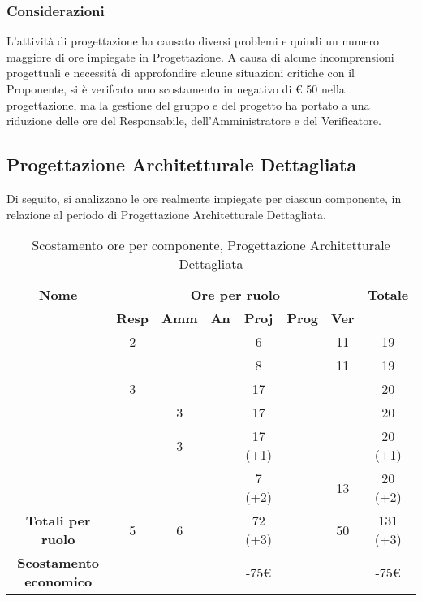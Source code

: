 \subsubsection{Considerazioni}
L'attività di progettazione ha causato diversi problemi e quindi un numero maggiore di ore impiegate in Progettazione. A causa di alcune incomprensioni progettuali e necessità di approfondire alcune situazioni critiche con il Proponente, si è verifcato uno scostamento in negativo di € 50 nella progettazione, ma la gestione del gruppo e del progetto ha portato a una riduzione delle ore del Responsabile, dell'Amministratore e del Verificatore.

\newpage
\subsection{Progettazione Architetturale Dettagliata}

Di seguito, si analizzano le ore realmente impiegate per ciascun componente, in relazione al periodo di Progettazione Architetturale Dettagliata.

\begin{table}[H]
	\begin{center}
		\begin{tabular}{|c|c|c|c|c|c|c|c|}
			\hline
			\textbf{Nome} & \multicolumn{6}{c|}{\textbf{Ore per ruolo}} & \textbf{Totale} \\\cline{2-7}
			& \textbf{Resp} & \textbf{Amm} & \textbf{An} & \textbf{Proj} & \textbf{Prog} & \textbf{Ver} & \\
			\hline
			\MC			&	2	&		&		&	6	&		&	11	&	19	\\
			\hline
			\AN			&		&		&		&	8	&   	&	11	& 	19	\\
			\hline
			\DAN		&	3	&		&		&	17	&		&		&	20	\\
			\hline
			\AS			&		&	3	&	 	&	17	&	 	& 		&	20	\\
			\hline
			\NS 		&		&	3	&		&	17 (+1)	&		& 		&	20 (+1)	\\
			\hline
			\DS			& 		&		&		&	7 (+2)	&		&	13	&	20 (+2)	\\
			\hline
			\textbf{Totali per ruolo}	& 	5 	&	6 	&		&	72 (+3)	&		&	50 	&	131 (+3)	\\
			\hline
			\textbf{Scostamento economico}	& 		&		&		&	-75€	&		&		&	-75€	\\
			\hline
		\end{tabular}
	\end{center}
	\caption{Scostamento ore per componente, Progettazione Architetturale Dettagliata}
\end{table}


